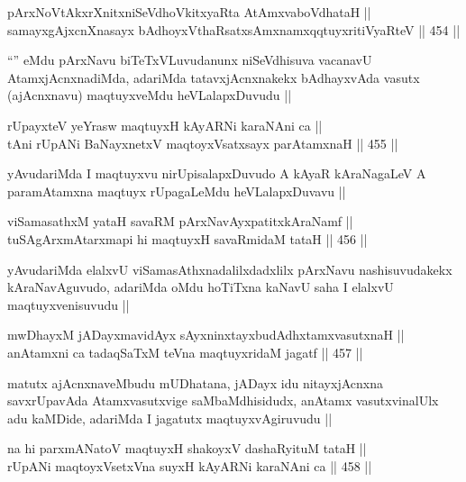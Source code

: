 
\begin{shl}
pArxNoVtAkxrXnitxniSeVdhoVkitxyaRta AtAmxvaboVdhataH || \\
samayxgAjxcnXnasayx bAdhoyxV\s thaRsatxsAmxnamxqqtuyxritiVyaRteV ||  454 ||  
\end{shl}

\begin{artha}
``\stext'' eMdu pArxNavu biTeTxVLuvudanunx niSeVdhisuva vacanavU AtamxjAcnxnadiMda, adariMda tatavxjAcnxnakekx bAdhayxvAda vasutx (ajAcnxnavu) maqtuyxveMdu heVLalapxDuvudu ||
\end{artha}


\begin{shl}
rUpayxteV yeYrasw maqtuyxH kAyARNi karaNAni ca || \\
tAni rUpANi BaNayxnetxV maqtoyxVsatxsayx parAtamxnaH ||  455 || 
\end{shl}

\begin{artha}
yAvudariMda I maqtuyxvu nirUpisalapxDuvudo A kAyaR kAraNagaLeV A paramAtamxna maqtuyx rUpagaLeMdu heVLalapxDuvavu ||
\end{artha}

\begin{shl}
viSamasathxM yataH savaRM pArxNavAyxpatitxkAraNamf || \\
tuSAgArxmAtarxmapi hi maqtuyxH savaRmidaM tataH ||  456 ||  
\end{shl}

\begin{artha}
yAvudariMda elalxvU viSamasAthxnadalilxdadxlilx pArxNavu nashisuvudakekx kAraNavAguvudo, adariMda oMdu hoTiTxna kaNavU saha I elalxvU maqtuyxvenisuvudu ||
\end{artha}

\begin{shl}
mwDhayxM jADayxmavidAyx sAyxninxtayxbudAdhxtamxvasutxnaH || \\
anAtamxni ca tadaqSaTxM teVna maqtuyxridaM jagatf ||  457 || 
\end{shl}

\begin{artha}
matutx ajAcnxnaveMbudu mUDhatana, jADayx idu nitayxjAcnxna savxrUpavAda Atamxvasutxvige saMbaMdhisidudx, anAtamx vasutxvinalUlx adu kaMDide, adariMda I jagatutx maqtuyxvAgiruvudu ||
\end{artha}

\begin{shl}
na hi parxmANatoV maqtuyxH shakoyxV dashaRyituM tataH || \\
rUpANi maqtoyxVsetxVna suyxH kAyARNi karaNAni ca ||  458 ||  
\end{shl}

